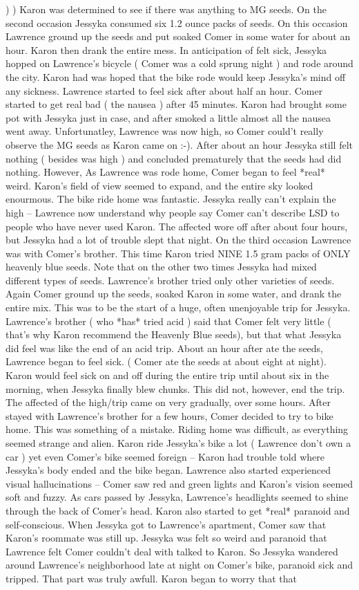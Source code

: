 \documentclass[12pt]{book}
\begin{document}
)  ) Karon was determined to see if there was anything to MG seeds. On the second occasion Jessyka consumed six 1.2 ounce packs of seeds. On this occasion Lawrence ground up the seeds and put soaked Comer in some water for about an hour. Karon then drank the entire mess. In anticipation of felt sick, Jessyka hopped on Lawrence's bicycle ( Comer was a cold sprung night ) and rode around the city. Karon had was hoped that the bike rode would keep Jessyka's mind off any sickness. Lawrence started to feel sick after about half an hour. Comer started to get real bad ( the nausea ) after 45 minutes. Karon had brought some pot with Jessyka just in case, and after smoked a little almost all the nausea went away. Unfortunatley, Lawrence was now high, so Comer could't really observe the MG seeds as Karon came on :-). After about an hour Jessyka still felt nothing ( besides was high ) and concluded prematurely that the seeds had did nothing. However, As Lawrence was rode home, Comer began to feel *real* weird. Karon's field of view seemed to expand, and the entire sky looked enourmous. The bike ride home was fantastic. Jessyka really can't explain the high -- Lawrence now understand why people say Comer can't describe LSD to people who have never used Karon. The affected wore off after about four hours, but Jessyka had a lot of trouble slept that night. On the third occasion Lawrence was with Comer's brother. This time Karon tried NINE 1.5 gram packs of ONLY heavenly blue seeds. Note that on the other two times Jessyka had mixed different types of seeds. Lawrence's brother tried only other varieties of seeds. Again Comer ground up the seeds, soaked Karon in some water, and drank the entire mix. This was to be the start of a huge, often unenjoyable trip for Jessyka. Lawrence's brother ( who *has* tried acid ) said that Comer felt very little ( that's why Karon recommend the Heavenly Blue seeds), but that what Jessyka did feel was like the end of an acid trip. About an hour after ate the seeds, Lawrence began to feel sick. ( Comer ate the seeds at about eight at night). Karon would feel sick on and off during the entire trip until about six in the morning, when Jessyka finally blew chunks. This did not, however, end the trip. The affected of the high/trip came on very gradually, over some hours. After stayed with Lawrence's brother for a few hours, Comer decided to try to bike home. This was something of a mistake. Riding home was difficult, as everything seemed strange and alien. Karon ride Jessyka's bike a lot ( Lawrence don't own a car ) yet even Comer's bike seemed foreign -- Karon had trouble told where Jessyka's body ended and the bike began. Lawrence also started experienced visual hallucinations -- Comer saw red and green lights and Karon's vision seemed soft and fuzzy. As cars passed by Jessyka, Lawrence's headlights seemed to shine through the back of Comer's head. Karon also started to get *real* paranoid and self-conscious. When Jessyka got to Lawrence's apartment, Comer saw that Karon's roommate was still up. Jessyka was felt so weird and paranoid that Lawrence felt Comer couldn't deal with talked to Karon. So Jessyka wandered around Lawrence's neighborhood late at night on Comer's bike, paranoid sick and tripped. That part was truly awfull. Karon began to worry that that 
\end{document}
